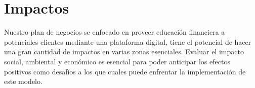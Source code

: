 \section*{Impactos}

Nuestro plan de negocios se enfocado en proveer educación financiera a potenciales clientes mediante una plataforma digital, tiene el potencial de hacer una gran cantidad de impactos en varias zonas esenciales. Evaluar el impacto social, ambiental y económico es esencial para poder anticipar los efectos positivos como desafíos a los que cuales puede enfrentar la implementación de este modelo.







